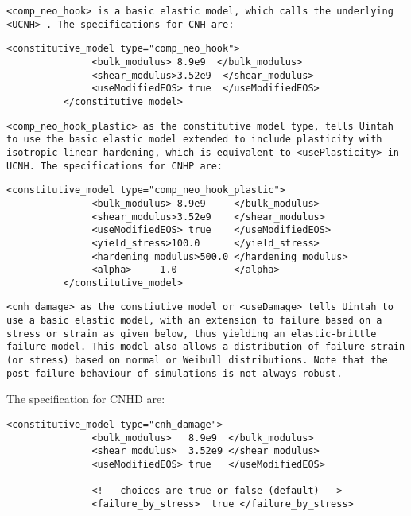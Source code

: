 \begin{enumerate}
\tt <comp\_neo\_hook> \normalfont is a basic elastic model, which calls the underlying \tt <UCNH> \normalfont .
The specifications for CNH are:

\begin{Verbatim}[fontsize=\footnotesize]
          <constitutive_model type="comp_neo_hook">
               <bulk_modulus> 8.9e9  </bulk_modulus>
               <shear_modulus>3.52e9  </shear_modulus>
               <useModifiedEOS> true  </useModifiedEOS>
          </constitutive_model>
\end{Verbatim}

\tt <comp\_neo\_hook\_plastic> \normalfont as the constitutive model type,
 tells Uintah to use the basic elastic model extended
to include plasticity with isotropic linear hardening, 
which is equivalent to \tt <usePlasticity> \normalfont in UCNH.
The specifications for CNHP are:

\begin{Verbatim}[fontsize=\footnotesize]
          <constitutive_model type="comp_neo_hook_plastic">
               <bulk_modulus> 8.9e9     </bulk_modulus>
               <shear_modulus>3.52e9    </shear_modulus>
               <useModifiedEOS> true    </useModifiedEOS>
               <yield_stress>100.0      </yield_stress>
               <hardening_modulus>500.0 </hardening_modulus>
               <alpha>     1.0          </alpha>
          </constitutive_model>
\end{Verbatim}


\tt <cnh\_damage> \normalfont as the constiutive model or \tt <useDamage> \normalfont 
tells Uintah to use a basic elastic model, with an extension
to failure based on a stress or strain as given below, thus yielding an
elastic-brittle failure model.  This model also allows a distribution
of failure strain (or stress) based on normal or Weibull distributions.
Note that the post-failure behaviour of simulations is not always robust.

The specification for CNHD are:

\begin{Verbatim}[fontsize=\footnotesize]
            <constitutive_model type="cnh_damage"> 
               <bulk_modulus>   8.9e9  </bulk_modulus>
               <shear_modulus>  3.52e9 </shear_modulus>
               <useModifiedEOS> true   </useModifiedEOS>
                
               <!-- choices are true or false (default) -->
               <failure_by_stress>  true </failure_by_stress>


\end{Verbatim}
\end{enumerate}
